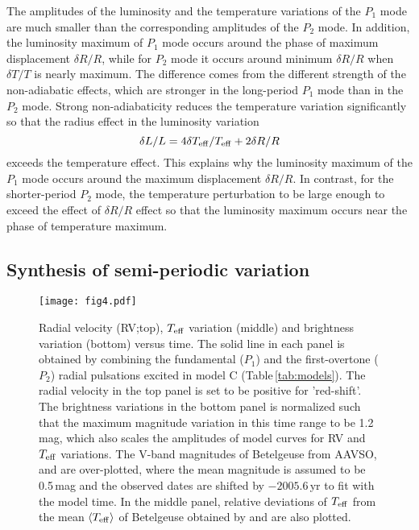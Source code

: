 \documentclass[fleqn,usenatbib]{mnras}
\begin{document}
The amplitudes of the luminosity and the temperature variations of 
the $P_1$ mode are much smaller than the corresponding amplitudes of the $P_2$ mode.
In addition,  the luminosity maximum of $P_1$ mode occurs around the phase 
of maximum displacement $\delta R/R$, while for $P_2$ mode it occurs 
around minimum $\delta R/R$ when $\delta T/T$ is nearly maximum.
The difference comes from the different strength of the non-adiabatic effects, which
 are stronger in the long-period $P_1$ mode than in the $P_2$ mode.
Strong non-adiabaticity reduces the temperature variation significantly
so that the radius effect in the luminosity variation
\begin{equation}
\delta L/L = 4\delta T_{\rm eff}/T_{\rm eff} + 2\delta R/R
\end{equation}
exceeds the temperature effect. 
This explains why the luminosity maximum of the $P_1$ mode occurs around the maximum 
displacement $\delta R/R$.  
In contrast, for the shorter-period $P_2$ mode, 
the temperature perturbation to be large enough 
to exceed the effect of $\delta R/R$ effect so that the luminosity maximum 
occurs near the phase of temperature maximum.



\subsection{Synthesis of semi-periodic variation}

\begin{figure}
\texttt{[image: fig4.pdf]} %
\caption{
Radial velocity (RV;top), $T_{\rm eff}$ variation (middle) 
and brightness variation (bottom) versus time.
The solid line in each panel is obtained by combining the fundamental ($P_1$) 
and the first-overtone ($P_2$) radial pulsations excited in 
model C (Table\,\ref{tab:models}). 
The radial velocity in the top panel is set to be positive for 'red-shift'. 
The brightness variations in the bottom panel
is normalized such that the maximum magnitude variation in this time range to be
1.2\, mag, which also scales the amplitudes of model curves
for RV and $T_{\rm eff}$ variations.
The V-band magnitudes of Betelgeuse from AAVSO,
 \citet{Harper2020} and \citet{Ogane2022} are over-plotted, 
where the mean magnitude is assumed
to be 0.5\,mag and the observed dates are shifted by $-2005.6$\,yr to fit with
the model time.   
In the middle panel, relative deviations of $T_{\rm eff}$ from the mean
$\langle T_{\rm eff}\rangle$ of Betelgeuse
obtained by \citet{Harper2020} and \citet{Taniguchi2022} are also plotted.  
 }
\label{fig:radVmag}
\end{figure}
\end{document}
